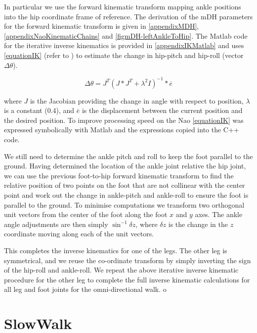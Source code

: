 \documentclass[pdftex,11pt,a4paper]{report}
\begin{document}
In particular we use the forward kinematic transform mapping ankle positions into the hip coordinate frame of reference. The derivation of the mDH parameters for the forward kinematic transform is given in \autoref{appendixMDH}, \autoref{appendixNaoKinematicChains} and \autoref{figmDH-leftAnkleToHip}. The Matlab code for the iterative inverse kinematics is provided in \autoref{appendixIKMatlab} and uses \autoref{equationIK} (refer to \cite{Buss04introductionto}) to estimate the change in hip-pitch and hip-roll (vector $\Delta \theta$). 

\begin{equation}
\Delta \theta = J^T(J*J^T+\lambda^2I)^{-1}*\overline e \label{equationIK}
\end{equation} 

where $J$ is the Jacobian providing the change in angle with respect to position, $\lambda $ is a constant (0.4), and $\overline e$ is the displacement between the current position and the desired position. To improve processing speed on the Nao \autoref{equationIK} was expressed symbolically with Matlab and the expressions copied into the C++ code. 

We still need to determine the ankle pitch and roll to keep the foot parallel to the ground. Having determined the location of the ankle joint relative the hip joint, we can use the previous foot-to-hip forward kinematic transform to find the relative position of two points on the foot that are not collinear with the center point  and work out the change in ankle-pitch and ankle-roll to ensure the foot is parallel to the ground. To minimise computations we transform two orthogonal unit vectors from the center of the foot along the foot $x$ and $y$ axes. The ankle angle adjustments are then simply $\sin^{-1} \delta z$, where $\delta z$ is the change in the $z$ coordinate moving along each of the unit vectors.  

This completes the inverse kinematics for one of the legs. The other leg is symmetrical, and we reuse the co-ordinate transform by simply inverting the sign of the hip-roll and ankle-roll. We repeat the above iterative inverse kinematic  procedure for the other leg to complete the full inverse kinematic calculations for all leg and foot joints for the omni-directional walk.  
o

\section{SlowWalk}\label{sectionSlowWalk}
\end{document}
